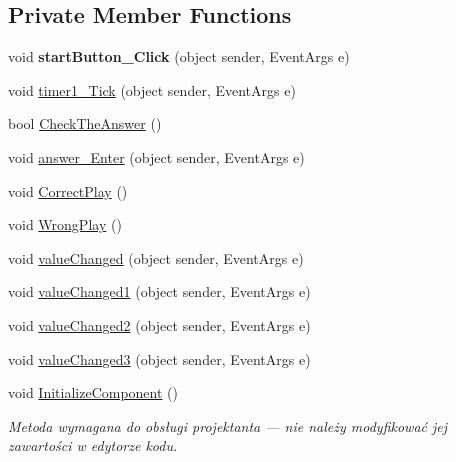 \subsection*{Private Member Functions}
\begin{DoxyCompactItemize}
\item 
\mbox{\label{class_quiz___matematyczny_1_1_test_a916c089a0ac827c2311acea436237803}} 
void {\bfseries start\+Button\+\_\+\+Click} (object sender, Event\+Args e)
\item 
void \mbox{\hyperlink{class_quiz___matematyczny_1_1_test_a9224087c42a9beb91c96420f3d4c2507}{timer1\+\_\+\+Tick}} (object sender, Event\+Args e)
\item 
bool \mbox{\hyperlink{class_quiz___matematyczny_1_1_test_ae19f992c94f6effaaecf8a015e5d92be}{Check\+The\+Answer}} ()
\item 
void \mbox{\hyperlink{class_quiz___matematyczny_1_1_test_adb70fa037d9769b356262bf9f5494370}{answer\+\_\+\+Enter}} (object sender, Event\+Args e)
\item 
void \mbox{\hyperlink{class_quiz___matematyczny_1_1_test_a2a3a7d1009cef2703bee2090b5ec89b1}{Correct\+Play}} ()
\item 
void \mbox{\hyperlink{class_quiz___matematyczny_1_1_test_a20f5bb5d06fca2ad7dee6a7c454ddb6e}{Wrong\+Play}} ()
\item 
void \mbox{\hyperlink{class_quiz___matematyczny_1_1_test_a56488f14545a35cd46328ba3b4012ce6}{value\+Changed}} (object sender, Event\+Args e)
\item 
void \mbox{\hyperlink{class_quiz___matematyczny_1_1_test_a414bd7e3fd06bc3cdba49d2bb0a03457}{value\+Changed1}} (object sender, Event\+Args e)
\item 
void \mbox{\hyperlink{class_quiz___matematyczny_1_1_test_af4858e74b30383ca7a95f7a292c76148}{value\+Changed2}} (object sender, Event\+Args e)
\item 
void \mbox{\hyperlink{class_quiz___matematyczny_1_1_test_a1ac3d8e7537eb39f68192c9bd8c7b9d4}{value\+Changed3}} (object sender, Event\+Args e)
\item 
void \mbox{\hyperlink{class_quiz___matematyczny_1_1_test_a6b40aa6b3256a95c2e6b54781d02d7f4}{Initialize\+Component}} ()
\begin{DoxyCompactList}\small\item\em Metoda wymagana do obsługi projektanta — nie należy modyfikować jej zawartości w edytorze kodu. \end{DoxyCompactList}\end{DoxyCompactItemize}
